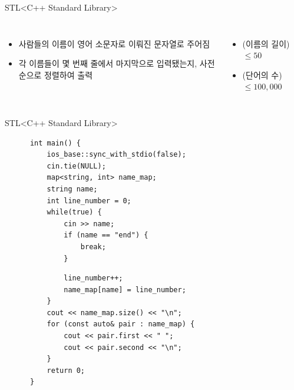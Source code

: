 \begin{frame}{STL}{<C++ Standard Library>}
  \begin{center}
  \end{center}
  \vspace{4mm}
  \begin{columns}[T]
      \begin{itemize}
        \item 사람들의 이름이 영어 소문자로 이뤄진 문자열로 주어짐
        \item 각 이름들이 몇 번째 줄에서 마지막으로 입력됐는지, 사전 순으로 정렬하여 출력
      \end{itemize}
      \begin{itemize}
        \item (이름의 길이) $\le 50$
        \item (단어의 수) $\le 100{,}000$
      \end{itemize}
  \end{columns}
\end{frame}

\begin{frame}[fragile]{STL}{<C++ Standard Library>}
  \begin{center}
  \end{center}
  \vspace{-2mm}
  \begin{twocol}
    \begin{verbatim}
      int main() {
          ios_base::sync_with_stdio(false);
          cin.tie(NULL);
          map<string, int> name_map;
          string name;
          int line_number = 0;
          while(true) {
              cin >> name;
              if (name == "end") {
                  break;
              }
    \end{verbatim}
  \colsplit
    \begin{verbatim}
              line_number++;
              name_map[name] = line_number;
          }
          cout << name_map.size() << "\n";
          for (const auto& pair : name_map) {
              cout << pair.first << " ";
              cout << pair.second << "\n";
          }
          return 0;
      }
    \end{verbatim}
  \end{twocol}
\end{frame}

